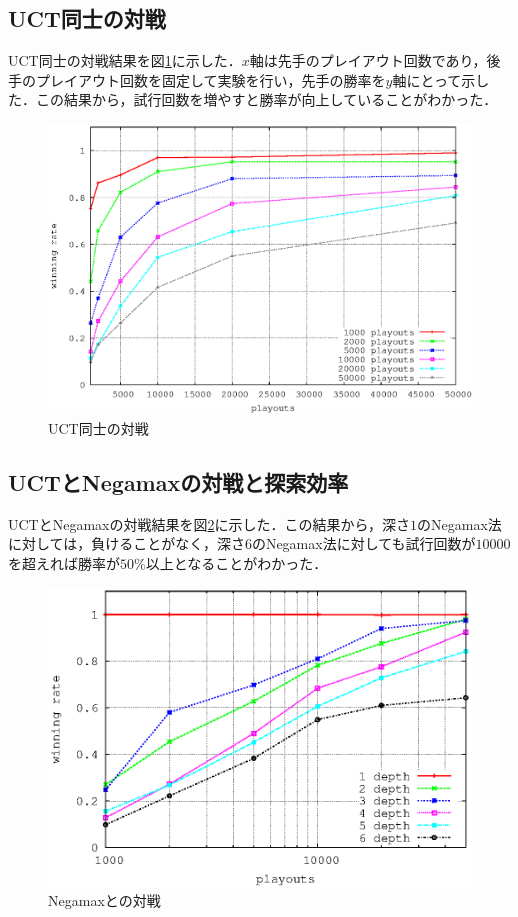 \documentclass{jarticle}
\begin{document}
\subsection{UCT同士の対戦}
UCT同士の対戦結果を図\ref{fig:vs_uct}に示した．$x$軸は先手のプレイアウト回数であり，後手のプレイアウト回数を固定して実験を行い，先手の勝率を$y$軸にとって示した．この結果から，試行回数を増やすと勝率が向上していることがわかった．

\begin{figure}[H]
	\centering
	\includegraphics[width=130mm]{image/vs_uct.eps}
	\caption{UCT同士の対戦\label{fig:vs_uct}}
\end{figure}


\subsection{UCTとNegamaxの対戦と探索効率}
UCTとNegamaxの対戦結果を図\ref{fig:vs_negamax}に示した．この結果から，深さ$1$のNegamax法に対しては，負けることがなく，深さ$6$のNegamax法に対しても試行回数が$10000$を超えれば勝率が$50 \% $以上となることがわかった．

\begin{figure}[H]
	\centering
	\includegraphics[width=130mm]{image/vs_negamax.eps}
	\caption{Negamaxとの対戦\label{fig:vs_negamax}}
\end{figure}
\end{document}

